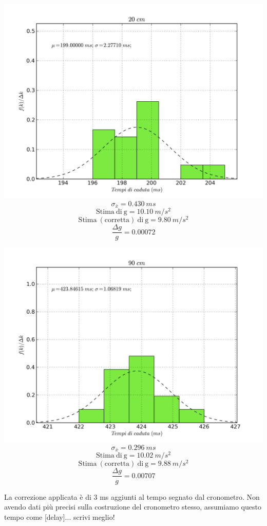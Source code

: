 \documentclass[a4paper,10pt]{report}
\begin{document}
\begin{center}
\includegraphics[scale=0.75]{../grafici/20cm.png}
$$\sigma_{\bar{x}} = 0.430\ ms$$
$$\mathrm{Stima\ di\ g} = 10.10\ m/s^2$$
$$\mathrm{Stima\ (corretta)\ di\ g} = 9.80\ m/s^2 $$
$$\frac{\Delta g}{g} = 0.00072$$

\includegraphics[scale=0.75]{../grafici/90cm.png}
$$\sigma_{\bar{x}} = 0.296\ ms $$
$$\mathrm{Stima\ di\ g} = 10.02\ m/s^2$$
$$\mathrm{Stima\ (corretta)\ di\ g} = 9.88\ m/s^2 $$
$$\frac{\Delta g}{g} = 0.00707$$
\end{center}

La correzione applicata è di 3 ms aggiunti al tempo segnato dal cronometro. Non avendo dati più precisi sulla costruzione del cronometro stesso, assumiamo questo tempo come [delay]... scrivi meglio!
\end{document}
